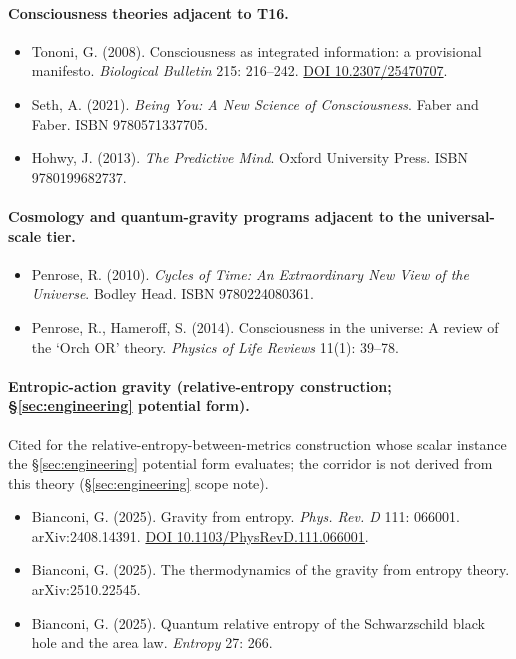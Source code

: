 \documentclass[11pt,a4paper]{article}
\begin{document}
\paragraph{Consciousness theories adjacent to T16.}
\begin{itemize}[leftmargin=*,itemsep=2pt]
\item Tononi, G. (2008). Consciousness as integrated information: a provisional manifesto. \emph{Biological Bulletin} 215: 216--242. \href{https://doi.org/10.2307/25470707}{DOI 10.2307/25470707}.
\item Seth, A. (2021). \emph{Being You: A New Science of Consciousness}. Faber and Faber. ISBN 9780571337705.
\item Hohwy, J. (2013). \emph{The Predictive Mind}. Oxford University Press. ISBN 9780199682737.
\end{itemize}

\paragraph{Cosmology and quantum-gravity programs adjacent to the universal-scale tier.}
\begin{itemize}[leftmargin=*,itemsep=2pt]
\item Penrose, R. (2010). \emph{Cycles of Time: An Extraordinary New View of the Universe}. Bodley Head. ISBN 9780224080361.
\item Penrose, R., Hameroff, S. (2014). Consciousness in the universe: A review of the `Orch OR' theory. \emph{Physics of Life Reviews} 11(1): 39--78.
\end{itemize}

\paragraph{Entropic-action gravity (relative-entropy construction; \S\ref{sec:engineering} potential form).} Cited for the relative-entropy-between-metrics construction whose scalar instance the \S\ref{sec:engineering} potential form evaluates; the corridor is not derived from this theory (\S\ref{sec:engineering} scope note).
\begin{itemize}[leftmargin=*,itemsep=2pt]
\item Bianconi, G. (2025). Gravity from entropy. \emph{Phys. Rev. D} 111: 066001. arXiv:2408.14391. \href{https://doi.org/10.1103/PhysRevD.111.066001}{DOI 10.1103/PhysRevD.111.066001}.
\item Bianconi, G. (2025). The thermodynamics of the gravity from entropy theory. arXiv:2510.22545.
\item Bianconi, G. (2025). Quantum relative entropy of the Schwarzschild black hole and the area law. \emph{Entropy} 27: 266.
\end{itemize}
\end{document}
